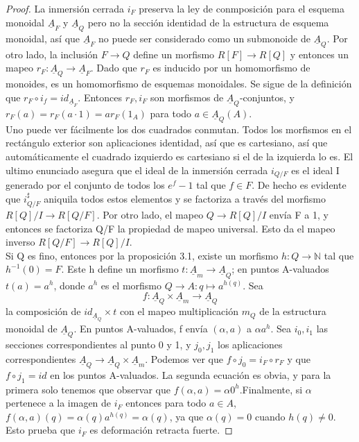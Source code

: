 \documentclass[12pt,spanish]{amsart}
\newcommand{\bb}[1]{\mathbb{#1}}
\theoremstyle{definition}
\theoremstyle{remark}
\begin{document}
\begin{proof}
La inmersión cerrada $i_{F}$ preserva la ley de conmposición para el esquema monoidal $\underline{A}_{F}$ y $\underline{A}_{Q}$ pero no la sección identidad de la estructura de esquema monoidal, así que $\underline{A}_{F}$ no puede ser considerado como un submonoide de $\underline{A}_{Q}$. Por otro lado, la inclusión $F \to Q$ define un morfismo $R[F] \to R[Q]$ y entonces un mapeo $r_{F}:\underline{A}_{Q} \to \underline{A}_{F}$. Dado que $r_{F}$ es inducido por un homomorfismo de monoides, es un homomorfismo de esquemas monoidales. Se sigue de la definición que $r_{F} \circ i_{f}=id_{\underline{A}_{F}}$. Entonces $r_{F},i_{F}$ son morfismos de $\underline{A}_{Q}$-conjuntos, y $r_{F}(a)=r_{F}(a\cdot 1)=ar_{F}(1_{A})$ para todo $a\in \underline{A}_{Q}(A)$. \\
Uno puede ver fácilmente los dos cuadrados conmutan. Todos los morfismos en el rectángulo exterior son aplicaciones identidad, así que es cartesiano, así que automáticamente el cuadrado izquierdo es cartesiano si el de la izquierda lo es. El ultimo enunciado asegura que el ideal de la inmersión cerrada $i_{Q/F}$ es el ideal I generado por el conjunto de todos los $e^{f}-1$ tal que $f\in F$. De hecho es evidente que $i_{Q/F}^{\sharp}$ aniquila todos estos elementos y se factoriza a través del morfismo $R[Q]/I \to R[Q/F]$. Por otro lado, el mapeo $Q \to R[Q]/I$ envía F a 1, y entonces se factoriza Q/F la propiedad de mapeo universal. Esto da el mapeo inverso $R[Q/F] \to R[Q]/I$. \\
Si Q es fino, entonces por la proposición 3.1, existe un morfismo $h:Q \to \bb{N}$ tal que $h^{-1}(0)=F$. Este h define un morfismo $t:\underline{A}_{m} \to \underline{A}_{Q}$;  en puntos A-valuados $t(a)=a^{h}$, donde $a^{h}$ es el  morfismo $Q \to A:q \mapsto a^{h(q)}$. Sea
$$f:\underline{A}_{Q}\times \underline{A}_{m} \to \underline{A}_{Q}$$ la composición de $id_{\underline{A}_{Q}}\times t$ con el mapeo multiplicación $m_{Q}$ de la estructura monoidal de $\underline{A}_{Q}$. En puntos A-valuados, f envía $(\alpha,a)$ a $\alpha a^{h}$. Sea $i_{0},i_{1}$ las secciones correspondientes al punto 0 y 1, y $j_{0},j_{1}$ los aplicaciones correspondientes $\underline{A}_{Q} \to \underline{A}_{Q} \times \underline{A}_{m}$. Podemos ver que $f\circ j_{0}=i_{F}\circ r_{F}$ y que $f\circ j_{1}=id$ en los puntos A-valuados. La segunda ecuación es obvia, y para la primera solo tenemos que observar que $f(\alpha,a)=\alpha 0^{h}$.Finalmente, si $\alpha$ pertenece a la imagen de $i_{F}$ entonces para todo $a\in A$, $f(\alpha,a)(q)=\alpha(q)a^{h(q)}=\alpha(q)$, ya que $\alpha(q)=0$ cuando $h(q)\neq 0$. Esto prueba que $i_{F}$ es deformación retracta fuerte. 
\end{proof}
\end{document}
